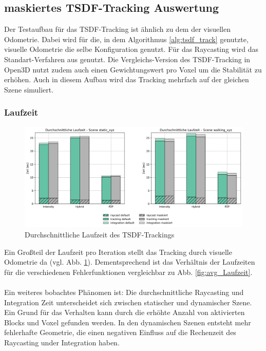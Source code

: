 \documentclass[12pt,DIV=15,BCOR=15mm,twoside,headsepline,abstract=true,listof=totoc,bibliography=totoc]{scrreprt}
\theoremstyle{remark}    %
\begin{document}
    \subsection{maskiertes TSDF-Tracking Auswertung}
    Der Testaufbau für das \ac{TSDF}-Tracking ist ähnlich zu dem der visuellen Odometrie.
    Dabei wird für die, in dem Algorithmus \ref{alg:tsdf_track} genutzte, visuelle Odometrie die selbe Konfiguration genutzt. Für das Raycasting wird das 
    Standart-Verfahren aus \cite{dong2023ashmodernframeworkparallel,Zhou2018} genutzt. Die Vergleichs-Version des \ac{TSDF}-Tracking in Open3D nutzt zudem auch einen
    Gewichtungswert pro Voxel um die Stabilität zu erhöhen. Auch in diesem Aufbau wird das Tracking mehrfach auf der gleichen Szene simuliert.
    
    \subsubsection{Laufzeit}
    \begin{figure}[h]
        \centering
        \includegraphics[width=\textwidth]{pics/tsdf_time_avg_split.png}
        \caption{Durchschnittliche Laufzeit des \ac{TSDF}-Trackings}
        \label{fig:tsdf_avg_time}
    \end{figure}\noindent
    Ein Großteil der Laufzeit pro Iteration stellt das Tracking durch visuelle Odometrie da (vgl. Abb. \ref{fig:tsdf_avg_time}). Dementsprechend ist das 
    Verhältnis der Laufzeiten für die verschiedenen Fehlerfunktionen vergleichbar zu Abb. \ref{fig:avg_Laufzeit}. \\\\
    Ein weiteres bobachtes Phänomen ist: Die durchschnittliche Raycasting und Integration Zeit unterscheidet sich zwischen statischer und dynamischer
    Szene. Ein Grund für das Verhalten kann durch die erhöhte Anzahl von aktivierten Blocks und Voxel gefunden werden. In den dynamischen Szenen entsteht
    mehr fehlerhafte Geometrie, die einen negativen Einfluss auf die Rechenzeit des Raycasting under Integration haben. \\\\
\end{document}
